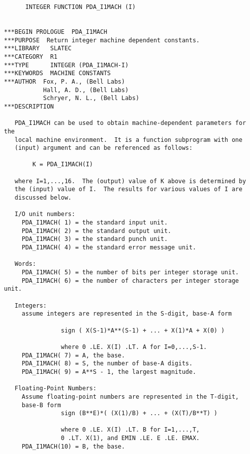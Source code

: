 

\begin{verbatim}
      INTEGER FUNCTION PDA_I1MACH (I)


***BEGIN PROLOGUE  PDA_I1MACH
***PURPOSE  Return integer machine dependent constants.
***LIBRARY   SLATEC
***CATEGORY  R1
***TYPE      INTEGER (PDA_I1MACH-I)
***KEYWORDS  MACHINE CONSTANTS
***AUTHOR  Fox, P. A., (Bell Labs)
           Hall, A. D., (Bell Labs)
           Schryer, N. L., (Bell Labs)
***DESCRIPTION

   PDA_I1MACH can be used to obtain machine-dependent parameters for the
   local machine environment.  It is a function subprogram with one
   (input) argument and can be referenced as follows:

        K = PDA_I1MACH(I)

   where I=1,...,16.  The (output) value of K above is determined by
   the (input) value of I.  The results for various values of I are
   discussed below.

   I/O unit numbers:
     PDA_I1MACH( 1) = the standard input unit.
     PDA_I1MACH( 2) = the standard output unit.
     PDA_I1MACH( 3) = the standard punch unit.
     PDA_I1MACH( 4) = the standard error message unit.

   Words:
     PDA_I1MACH( 5) = the number of bits per integer storage unit.
     PDA_I1MACH( 6) = the number of characters per integer storage unit.

   Integers:
     assume integers are represented in the S-digit, base-A form

                sign ( X(S-1)*A**(S-1) + ... + X(1)*A + X(0) )

                where 0 .LE. X(I) .LT. A for I=0,...,S-1.
     PDA_I1MACH( 7) = A, the base.
     PDA_I1MACH( 8) = S, the number of base-A digits.
     PDA_I1MACH( 9) = A**S - 1, the largest magnitude.

   Floating-Point Numbers:
     Assume floating-point numbers are represented in the T-digit,
     base-B form
                sign (B**E)*( (X(1)/B) + ... + (X(T)/B**T) )

                where 0 .LE. X(I) .LT. B for I=1,...,T,
                0 .LT. X(1), and EMIN .LE. E .LE. EMAX.
     PDA_I1MACH(10) = B, the base.


\end{verbatim}
